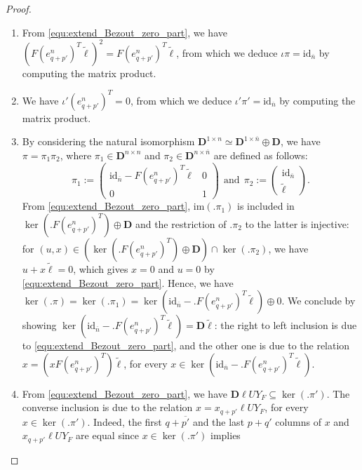 \documentclass[10pt]{article}
\newcommand\g[1]{\textbf{#1}}
\newcommand\id[1]{\text{id}_{#1}}
\newcommand\im[1]{\text{im}\left(#1\right)}
\newcommand\D{\g{D}}
\begin{document}
\begin{proof}
  \begin{enumerate}
  \item From \eqref{equ:extend_Bezout_zero_part}, we have $\left(F(
    e^{n}_{q+p'})^T\tilde{\ell}\right)^2=F(e^{n}_{q+p'})^T\tilde{\ell}$,
    from which we deduce $\iota\pi=\id{\overline{n}}$ by computing the
    matrix product. 
  \item We have $\iota'(e^n_{q+p'})^T=0$, from which we deduce $\iota'
    \pi'=\id{\overline{n}}$ by computing the matrix product.
  \item By considering the natural isomorphism $\D^{1\times n}\simeq
    \D^{1\times\overline{n}}\oplus\D$, we have $\pi=\pi_1\pi_2$,
    where $\pi_1\in\D^{n\times n}$ and $\pi_2\in\D^{n\times \overline{n}}$
    are defined as follows:
    \[\pi_1:=\begin{pmatrix}
    \id{\overline{n}}-F(e^{n}_{q+p'})^T\tilde{\ell} & 0\\
    0 & 1
    \end{pmatrix}\ \ \text{and}\ \
    \pi_2:=\begin{pmatrix}
    \id{\overline{n}}\\
    \tilde{\ell}
    \end{pmatrix}.\]
    From \eqref{equ:extend_Bezout_zero_part}, $\im{.\pi_1}$ is included in
    $\ker(.F(e^{n}_{q+p'})^T)\oplus\D$ and the restriction of $.\pi_2$ to
    the latter is injective: for $(u,x)\in\left(\ker(.F(e^{n}_{q+p'})^T)
    \oplus\D\right)\cap\ker(.\pi_2)$, we have $u+x\tilde{\ell}=0$, which
    gives $x=0$ and $u=0$ by \eqref{equ:extend_Bezout_zero_part}. Hence, we
    have $\ker(.\pi)=\ker(.\pi_1)=\ker\left(\id{\overline{n}}-.F(e^{n}_{q+
      p'})^T\tilde{\ell}\right)\oplus 0$. We conclude by showing $\ker
    \left(\id{\overline{n}}- .F(e^{n}_{q+p'})^T\tilde{\ell}\right)=\D
    \tilde{\ell}$: the right to left inclusion is due to
    \eqref{equ:extend_Bezout_zero_part}, and the other one is due to the
    relation $x=\left(xF(e^n_{q+p'})^T\right)\tilde{\ell}$, for every $x\in
    \ker\left(\id{\overline{n}}-.F(e^n_{q+p'})^T\tilde{\ell}\right)$.
  \item From \eqref{equ:extend_Bezout_zero_part}, we have 
    $\D\ell UY_F\subseteq\ker(.\pi')$. The converse inclusion is due to the
    relation $x=x_{q+p'}\ell UY_F$, for every $x\in\ker(.\pi')$. Indeed,
    the first $q+\overline{p'}$ and the last $p+q'$ columns of $x$ and
    $x_{q+p'}\ell UY_F$ are equal since $x\in\ker(.\pi')$ implies
    \begin{equation}\label{equ:ker_pip_zero_part_1}

\end{equation}
\end{enumerate}
\end{proof}
\end{document}
